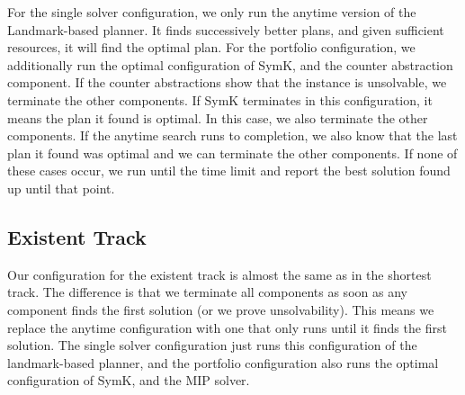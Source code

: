 \documentclass{article}
\renewcommand{\todo}[1]{} %
\begin{document}
For the single solver configuration, we only run the anytime version of the Landmark-based planner. It finds successively better plans, and given sufficient resources, it will find the optimal plan. For the portfolio configuration, we additionally run the optimal configuration of SymK, and the counter abstraction component. If the counter abstractions show that the instance is unsolvable, we terminate the other components. If SymK terminates in this configuration, it means the plan it found is optimal. In this case, we also terminate the other components. If the anytime search runs to completion, we also know that the last plan it found was optimal and we can terminate the other components. If none of these cases occur, we run until the time limit and report the best solution found up until that point.

\todo{\begin{itemize}
    \item For the single solver configuration, we only run the anytime version of the Landmark-based planner. It finds successively better plans, and given sufficient resources, it will find the optimal plan.
    \item For the portfolio configuration, we additionally run the optimal configuration of SymK, and the counter abstraction component.
    \item If the counter abstractions show that the instance is unsolvable, we terminate the other components.
    \item If SymK terminates in this configuration, it means the plan it found is optimal. in this case, we also terminate the other components.
    \item If the anytime search runs to completion, we also know that the last plan it found was optimal and we can terminate the other components.
    \item If none of these cases occur, we run until the time limit and report the best solution found until then.
\end{itemize}}


\subsection{Existent Track}

Our configuration for the existent track is almost the same as in the shortest track. The difference is that we terminate all components as soon as any component finds the first solution (or we prove unsolvability). This means we replace the anytime configuration with one that only runs until it finds the first solution. The single solver configuration just runs this configuration of the landmark-based planner, and the portfolio configuration also runs the optimal configuration of SymK, and the MIP solver.
\end{document}
